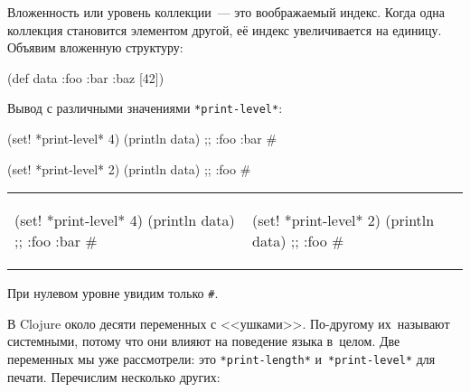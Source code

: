 Вложенность или уровень коллекции~--- это воображаемый индекс. Когда одна коллекция
становится элементом другой, её индекс увеличивается на единицу. Объявим
вложенную структуру:

\begin{english}
  \begin{clojure}
(def data {:foo
            {:bar
              {:baz [42]}}})
  \end{clojure}
\end{english}

Вывод с различными значениями \texttt{*print\--le\-vel*}:

\ifnarrow

\begin{english}
  \begin{clojure}
(set! *print-level* 4)
(println data)
;; {:foo {:bar #}}
  \end{clojure}

\splitter

  \begin{clojure}
(set! *print-level* 2)
(println data)
;; {:foo #}
  \end{clojure}
\end{english}

\else

\begin{english}
\noindent
\begin{tabular}{ @{}p{5cm} @{}p{5cm} }


  \begin{clojure}
(set! *print-level* 4)
(println data)
;; {:foo {:bar #}}
  \end{clojure}

&

  \begin{clojure}
(set! *print-level* 2)
(println data)
;; {:foo #}
  \end{clojure}

\end{tabular}

\end{english}

\fi

\noindent
При нулевом уровне увидим только \verb|#|.

В Clojure около десяти переменных с <<ушками>>. По-другому их~называют
системными, потому что они влияют на поведение языка в~целом. Две переменных мы
уже рассмотрели: это \verb|*print-length*| и~\verb|*print-level*| для
печати. Перечислим несколько других:


